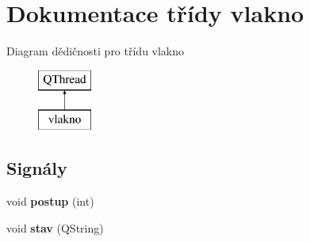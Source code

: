 \hypertarget{classvlakno}{}\section{Dokumentace třídy vlakno}
\label{classvlakno}
Diagram dědičnosti pro třídu vlakno\begin{figure}[H]
\begin{center}
\leavevmode
\includegraphics[height=2.000000cm]{classvlakno}
\end{center}
\end{figure}
\subsection*{Signály}
\begin{DoxyCompactItemize}
\item 
\hypertarget{classvlakno_a84e4288b71add497b01c136f769e450a}{}void {\bfseries postup} (int)\label{classvlakno_a84e4288b71add497b01c136f769e450a}

\item 
\hypertarget{classvlakno_a74cb6d1e1b06c8bea2b4d1c7a29f6a86}{}void {\bfseries stav} (Q\+String)\label{classvlakno_a74cb6d1e1b06c8bea2b4d1c7a29f6a86}

\end{DoxyCompactItemize}
